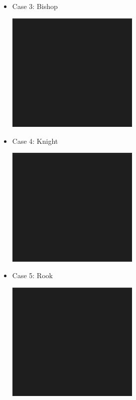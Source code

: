 \documentclass[12pt, titlepage]{article}
\begin{document}
\begin{itemize}
  \item Case 3: Bishop   
  \begin{minipage}{\linewidth}
    \centering
    \includegraphics[width=0.5\textwidth]{bishop}
\end{minipage}
  \item Case 4: Knight   
  \begin{minipage}{\linewidth}
    \centering
    \includegraphics[width=0.5\textwidth]{knight}
\end{minipage}
  \item Case 5: Rook   
  \begin{minipage}{\linewidth}
    \centering
    \includegraphics[width=0.5\textwidth]{rook}

\end{minipage}
\end{itemize}
\end{document}
